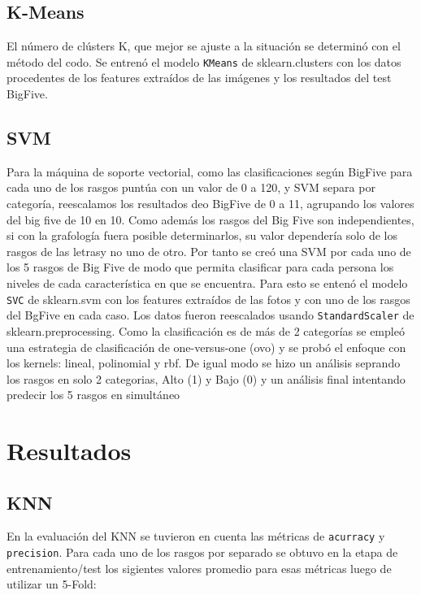 \documentclass[10pt, a4paper]{article}
\begin{document}
        \subsection{K-Means}
            El n\'umero de cl\'usters K, que mejor se ajuste a la situaci\'on se determin\'o con el m\'etodo del codo. Se entren\'o el 
            modelo \texttt{KMeans} de sklearn.clusters con los datos procedentes de los features extra\'idos de las im\'agenes y los resultados del 
            test BigFive.
        
        \subsection{SVM}
            Para la m\'aquina de soporte vectorial, como las clasificaciones seg\'un BigFive para cada uno de los rasgos punt\'ua con un valor de 0 a 120, y SVM separa por categor\'ia,
            reescalamos los resultados deo BigFive de 0 a 11, agrupando los valores del big five de 10 en 10. Como adem\'as los rasgos del Big Five son independientes, si con la grafolog\'ia fuera posible determinarlos, su valor depender\'ia solo de los rasgos de las letrasy no uno de otro.
            Por tanto se cre\'o una SVM por cada uno de los 5 rasgos de Big Five de modo que permita clasificar para cada persona los niveles de cada caracter\'istica en que se encuentra. Para esto se enten\'o el modelo \texttt{SVC} de sklearn.svm con los features extra\'idos de las fotos y con uno de los rasgos del BgFive en cada caso.
            Los datos fueron reescalados usando \texttt{StandardScaler} de sklearn.preprocessing.
            Como la clasificaci\'on es de m\'as de 2 categor\'ias se emple\'o una estrategia de clasificaci\'on de one-versus-one (ovo) y se prob\'o el enfoque con los kernels: lineal, polinomial y rbf. De igual modo se hizo un an\'alisis seprando los rasgos en solo 2 categorias, Alto (1) y Bajo (0) y un an\'alisis final intentando predecir 
            los 5 rasgos en simult\'aneo

    \section{Resultados}
            \subsection{KNN}
                En la evaluaci\'on del KNN se tuvieron en cuenta las m\'etricas de \texttt{acurracy} y \texttt{precision}. Para cada uno de los rasgos por separado se
                obtuvo en la etapa de entrenamiento/test los sigientes valores promedio para esas m\'etricas luego de utilizar un 5-Fold: \\
\end{document}

